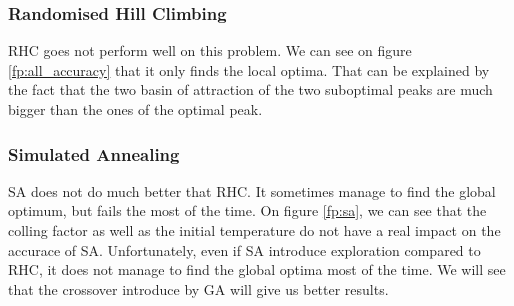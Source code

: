 \documentclass[twocolumn, 10pt]{article}
\begin{document}
			\subsubsection*{Randomised Hill Climbing}
				RHC goes not perform well on this problem. We can see on figure \ref{fp:all_accuracy} that it only finds the local optima. That can be explained by the fact that the two  basin of attraction of the two suboptimal peaks are much bigger than the ones of the
				optimal peak.
			\subsubsection*{Simulated Annealing}
				SA does not do much better that RHC. It sometimes manage to find the global optimum, but fails the most of the time. On figure \ref{fp:sa}, we can see that the colling factor as well as the initial temperature do not have a real impact on the accurace of SA. Unfortunately, even if SA introduce exploration compared to RHC, it does not manage to find the global optima most of the time. We will see that the crossover introduce by GA will give us better results.
\end{document}
